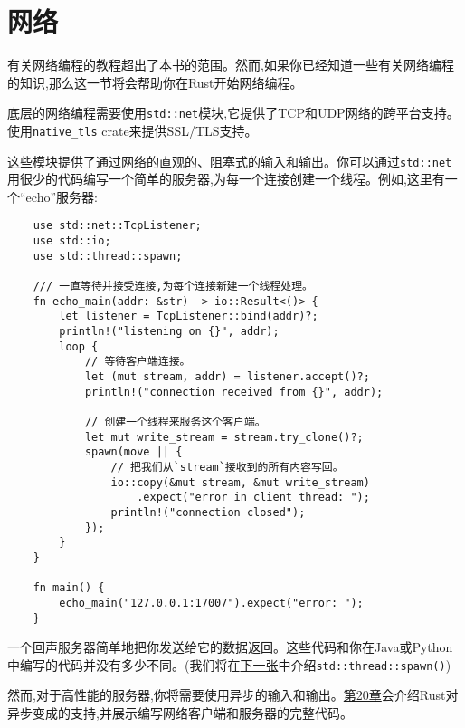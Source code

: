 \section{网络}

有关网络编程的教程超出了本书的范围。然而,如果你已经知道一些有关网络编程的知识,那么这一节将会帮助你在Rust开始网络编程。

底层的网络编程需要使用\texttt{std::net}模块,它提供了TCP和UDP网络的跨平台支持。使用\texttt{native\_tls} crate来提供SSL/TLS支持。

这些模块提供了通过网络的直观的、阻塞式的输入和输出。你可以通过\texttt{std::net}用很少的代码编写一个简单的服务器,为每一个连接创建一个线程。例如,这里有一个“echo”服务器:
\begin{verbatim}
    use std::net::TcpListener;
    use std::io;
    use std::thread::spawn;

    /// 一直等待并接受连接,为每个连接新建一个线程处理。
    fn echo_main(addr: &str) -> io::Result<()> {
        let listener = TcpListener::bind(addr)?;
        println!("listening on {}", addr);
        loop {
            // 等待客户端连接。
            let (mut stream, addr) = listener.accept()?;
            println!("connection received from {}", addr);

            // 创建一个线程来服务这个客户端。
            let mut write_stream = stream.try_clone()?;
            spawn(move || {
                // 把我们从`stream`接收到的所有内容写回。
                io::copy(&mut stream, &mut write_stream)
                    .expect("error in client thread: ");
                println!("connection closed");
            });
        }
    }

    fn main() {
        echo_main("127.0.0.1:17007").expect("error: ");
    }
\end{verbatim}

一个回声服务器简单地把你发送给它的数据返回。这些代码和你在Java或Python中编写的代码并没有多少不同。(我们将在\hyperref[ch19]{下一张}中介绍\texttt{std::thread::spawn()})

然而,对于高性能的服务器,你将需要使用异步的输入和输出。\hyperref[ch20]{第20章}会介绍Rust对异步变成的支持,并展示编写网络客户端和服务器的完整代码。

